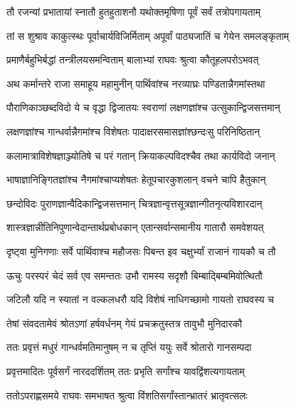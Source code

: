 
\twolineshloka
{तौ रजन्यां प्रभातायां स्नातौ हुतहुताशनौ}
{यथोक्तमृषिणा पूर्वं सर्वं तत्रोपगायताम्} %

\twolineshloka
{तां स शुश्राव काकुत्स्थः पूर्वाचार्यविजिर्मिताम्}
{अपूर्वां पाठ्यजातिं च गेयेन समलङ्कृताम्} %

\twolineshloka
{प्रमाणैर्बहुभिर्बद्धां तन्त्रीलयसमन्विताम्}
{बालाभ्यां राघवः श्रुत्वा कौतूहलपरोऽभवत्} %

\twolineshloka
{अथ कर्मान्तरे राजा समाहूय महामुनीन्}
{पार्थिवांश्च नरव्याघ्रः पण्डितान्नैगमांस्तथा} %

\twolineshloka
{पौराणिकाञ्छब्दविदो ये च वृद्धा द्विजातयः}
{स्वराणां लक्षणज्ञांश्च उत्सुकान्द्विजसत्तमान्} %

\twolineshloka
{लक्षणज्ञांश्च गान्धर्वान्नैगमांश्च विशेषतः}
{पादाक्षरसमासज्ञांश्छन्दःसु परिनिष्ठितान्} %

\twolineshloka
{कलामात्राविशेषज्ञाञ्ज्योतिषे च परं गतान्}
{क्रियाकल्पविदश्चैव तथा कार्यविदो जनान्} %

\twolineshloka
{भाषाज्ञानिङ्गितज्ञांश्च नैगमांश्चाप्यशेषतः}
{हेतूपचारकुशलान् वचने चापि हैतुकान्} %

\twolineshloka
{छन्दोविदः पुराणज्ञान्वैदिकान्द्विजसत्तमान्}
{चित्रज्ञान्वृत्तसूत्रज्ञान्गीतनृत्यविशारदान्} %

\twolineshloka
{शास्त्रज्ञान्नीतिनिपुणान्वेदान्तार्थप्रबोधकान्}
{एतान्सर्वान्समानीय गातारौ समवेशयत्} %

\twolineshloka
{दृष्ट्वा मुनिगणाः सर्वे पार्थिवाश्च महौजसः}
{पिबन्त इव चक्षुर्भ्यां राजानं गायकौ च तौ} %

\twolineshloka
{ऊचुः परस्परं चेदं सर्व एव समन्ततः}
{उभौ रामस्य सदृशौ बिम्बाद्बिम्बमिवोत्थितौ} %

\twolineshloka
{जटिलौ यदि न स्यातां न वल्कलधरौ यदि}
{विशेषं नाधिगच्छामो गायतो राघवस्य च} %

\twolineshloka
{तेषां संवदतामेवं श्रोतऽणां हर्षवर्धनम्}
{गेयं प्रचक्रतुस्तत्र तावुभौ मुनिदारकौ} %

\twolineshloka
{ततः प्रवृत्तं मधुरं गान्धर्वमतिमानुषम्}
{न च तृप्तिं ययुः सर्वे श्रोतारो गानसम्पदा} %

\twolineshloka
{प्रवृत्तमादितः पूर्वसर्गं नारददर्शितम्}
{ततः प्रभृति सर्गांश्च यावद्विंशत्यगायताम्} %

\twolineshloka
{ततोऽपराह्णसमये राघवः समभाषत}
{श्रुत्वा विंशतिसर्गांस्तान्भ्रातरं भ्रातृवत्सलः} %

